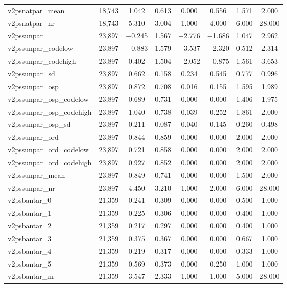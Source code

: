 \begin{table}[!htbp]
\begin{tabular}{@{\extracolsep{5pt}}lccccccc}
v2psnatpar\_mean & 18,743 & 1.042 & 0.613 & 0.000 & 0.556 & 1.571 & 2.000 \\ 
v2psnatpar\_nr & 18,743 & 5.310 & 3.004 & 1.000 & 4.000 & 6.000 & 28.000 \\ 
v2pssunpar & 23,897 & $-$0.245 & 1.567 & $-$2.776 & $-$1.686 & 1.047 & 2.962 \\ 
v2pssunpar\_codelow & 23,897 & $-$0.883 & 1.579 & $-$3.537 & $-$2.320 & 0.512 & 2.314 \\ 
v2pssunpar\_codehigh & 23,897 & 0.402 & 1.504 & $-$2.052 & $-$0.875 & 1.561 & 3.653 \\ 
v2pssunpar\_sd & 23,897 & 0.662 & 0.158 & 0.234 & 0.545 & 0.777 & 0.996 \\ 
v2pssunpar\_osp & 23,897 & 0.872 & 0.708 & 0.016 & 0.155 & 1.595 & 1.989 \\ 
v2pssunpar\_osp\_codelow & 23,897 & 0.689 & 0.731 & 0.000 & 0.000 & 1.406 & 1.975 \\ 
v2pssunpar\_osp\_codehigh & 23,897 & 1.040 & 0.738 & 0.039 & 0.252 & 1.861 & 2.000 \\ 
v2pssunpar\_osp\_sd & 23,897 & 0.211 & 0.087 & 0.040 & 0.145 & 0.260 & 0.498 \\ 
v2pssunpar\_ord & 23,897 & 0.844 & 0.859 & 0.000 & 0.000 & 2.000 & 2.000 \\ 
v2pssunpar\_ord\_codelow & 23,897 & 0.721 & 0.858 & 0.000 & 0.000 & 2.000 & 2.000 \\ 
v2pssunpar\_ord\_codehigh & 23,897 & 0.927 & 0.852 & 0.000 & 0.000 & 2.000 & 2.000 \\ 
v2pssunpar\_mean & 23,897 & 0.849 & 0.741 & 0.000 & 0.000 & 1.500 & 2.000 \\ 
v2pssunpar\_nr & 23,897 & 4.450 & 3.210 & 1.000 & 2.000 & 6.000 & 28.000 \\ 
v2psbantar\_0 & 21,359 & 0.241 & 0.309 & 0.000 & 0.000 & 0.500 & 1.000 \\ 
v2psbantar\_1 & 21,359 & 0.225 & 0.306 & 0.000 & 0.000 & 0.400 & 1.000 \\ 
v2psbantar\_2 & 21,359 & 0.217 & 0.297 & 0.000 & 0.000 & 0.400 & 1.000 \\ 
v2psbantar\_3 & 21,359 & 0.375 & 0.367 & 0.000 & 0.000 & 0.667 & 1.000 \\ 
v2psbantar\_4 & 21,359 & 0.219 & 0.317 & 0.000 & 0.000 & 0.333 & 1.000 \\ 
v2psbantar\_5 & 21,359 & 0.569 & 0.373 & 0.000 & 0.250 & 1.000 & 1.000 \\ 
v2psbantar\_nr & 21,359 & 3.547 & 2.333 & 1.000 & 1.000 & 5.000 & 28.000 \\ 

\end{tabular}
\end{table}
